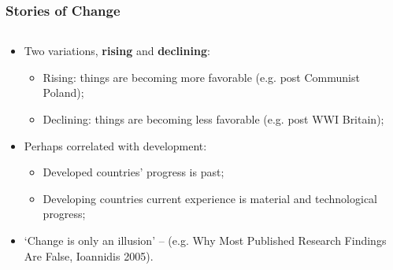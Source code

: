 \documentclass[aspectratio=169]{beamer}
\theoremstyle{principle}
\begin{document}
\begin{frame}
\frametitle{Stories of Change}
\begin{columns}
\begin{column}{0.5\textwidth}

\begin{itemize}
\item Two variations, \textbf{rising} and \textbf{declining}:
\begin{itemize}
\item Rising: things are becoming more favorable (e.g. post Communist Poland);
\item Declining: things are becoming less favorable (e.g. post WWI Britain);
\end{itemize}
\bigskip
\item Perhaps correlated with development:
\begin{itemize}
\item Developed countries' progress is past;
\item Developing countries current experience is material and technological progress;
\end{itemize}
\bigskip
\item `Change is only an illusion' -- (e.g. Why Most Published Research Findings Are False, Ioannidis 2005).
\end{itemize}


\end{column}
\end{columns}
\end{frame}
\end{document}
